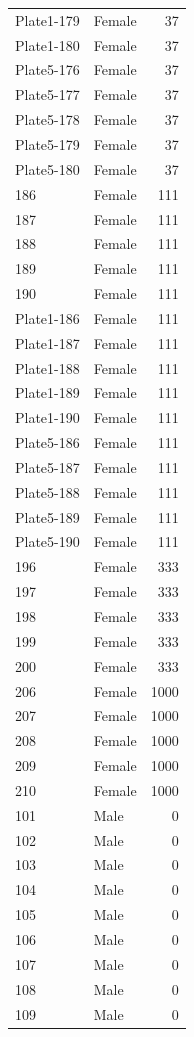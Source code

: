 \begin{longtable}{l l r}
Plate1-179 & Female & 37 \\
Plate1-180 & Female & 37 \\
Plate5-176 & Female & 37 \\
Plate5-177 & Female & 37 \\
Plate5-178 & Female & 37 \\
Plate5-179 & Female & 37 \\
Plate5-180 & Female & 37 \\
186 & Female & 111 \\
187 & Female & 111 \\
188 & Female & 111 \\
189 & Female & 111 \\
190 & Female & 111 \\
Plate1-186 & Female & 111 \\
Plate1-187 & Female & 111 \\
Plate1-188 & Female & 111 \\
Plate1-189 & Female & 111 \\
Plate1-190 & Female & 111 \\
Plate5-186 & Female & 111 \\
Plate5-187 & Female & 111 \\
Plate5-188 & Female & 111 \\
Plate5-189 & Female & 111 \\
Plate5-190 & Female & 111 \\
196 & Female & 333 \\
197 & Female & 333 \\
198 & Female & 333 \\
199 & Female & 333 \\
200 & Female & 333 \\
206 & Female & 1000 \\
207 & Female & 1000 \\
208 & Female & 1000 \\
209 & Female & 1000 \\
210 & Female & 1000 \\
101 & Male & 0 \\
102 & Male & 0 \\
103 & Male & 0 \\
104 & Male & 0 \\
105 & Male & 0 \\
106 & Male & 0 \\
107 & Male & 0 \\
108 & Male & 0 \\
109 & Male & 0 \\

\end{longtable}
